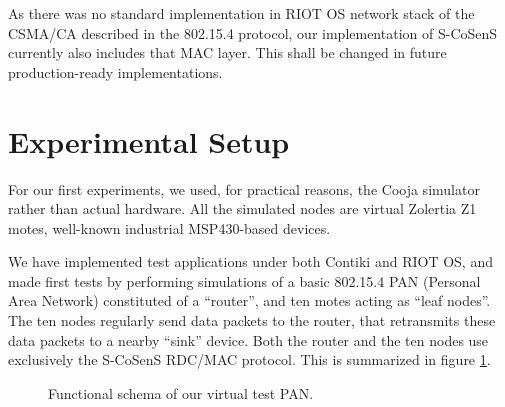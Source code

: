 \documentclass[12pt,a4paper]{article}
\begin{document}
As there was no standard implementation in RIOT OS network stack of
the CSMA/CA described in the 802.15.4 protocol, our implementation of
S-CoSenS currently also includes that MAC layer. This shall be changed
in future production-ready implementations.



\section{Experimental Setup}

For our first experiments, we used, for practical reasons, the Cooja
simulator rather than actual hardware. All the simulated nodes are
virtual Zolertia Z1 motes, well-known industrial MSP430-based devices.

We have implemented test applications under both Contiki and RIOT OS, and
made first tests by performing simulations of a basic 802.15.4 PAN
(Personal Area Network) constituted of a ``router'', and ten motes
acting as ``leaf nodes''. The ten nodes regularly send data packets to
the router, that retransmits these data packets to a nearby ``sink'' device.
Both the router and the ten nodes use exclusively the S-CoSenS RDC/MAC
protocol. This is summarized in figure \ref{FigPANtest}.

\begin{figure}[!h]
\centering
{}
\caption{Functional schema of our virtual test PAN.}
\label{FigPANtest}
\end{figure}
\end{document}
